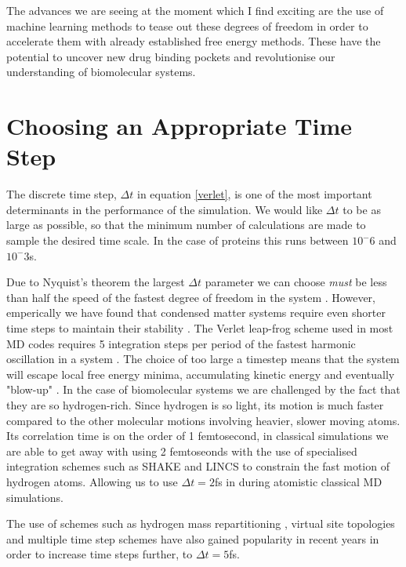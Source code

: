 The advances we are seeing at the moment which I find exciting are the use of machine learning methods to tease out these degrees of freedom in order to accelerate them with already established free energy methods. These have the potential to uncover new drug binding pockets and revolutionise our understanding of biomolecular systems. 


\section{Choosing an Appropriate Time Step}
The discrete time step, $\Delta t$ in equation \ref{verlet}, is one of the most important determinants in the performance of the simulation. We would like $\Delta t$ to be as large as possible, so that the minimum number of calculations are made to sample the desired time scale. In the case of proteins this runs between $10^-6$ and $10^-3$s.  

Due to Nyquist's theorem the largest $\Delta t$ parameter we can choose \textit{must} be less than half the speed of the fastest degree of freedom in the system \cite{shannon1949}. However, emperically we have found that condensed matter systems require even shorter time steps to maintain their stability \cite{leach2001}. The Verlet leap-frog scheme used in most MD codes requires 5 integration steps per period of the fastest harmonic oscillation in a system \cite{mazur1997}\cite{feenstra1999}. The choice of too large a timestep means that the system will escape local free energy minima, accumulating kinetic energy and eventually "blow-up" \cite{braun2019}. In the case of biomolecular systems we are challenged by the fact that they are so hydrogen-rich. Since hydrogen is so light, its motion is much faster compared to the other molecular motions involving heavier, slower moving atoms. Its correlation time is on the order of 1 femtosecond, in classical simulations we are able to get away with using 2 femtoseonds with the use of specialised integration schemes such as SHAKE\cite{andersen1983} and LINCS\cite{hess1997} to constrain the fast motion of hydrogen atoms. Allowing us to use $\Delta t = 2$fs in during atomistic classical MD simulations.

The use of schemes such as hydrogen mass repartitioning \cite{balusek2019}, virtual site topologies \cite{feenstra1999} and multiple time step schemes\cite{} have also gained popularity in recent years in order to increase time steps further, to $\Delta t = 5$fs. 

